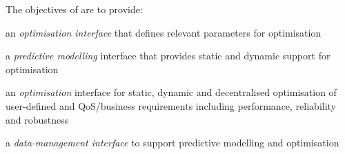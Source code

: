 \addtocounter{wpno}{1}
\begin{Workpackage}{\thewpno}
\WPTitle{\wpname{\thewpno}}


\begin{WPObjectives}
The objectives of \theWP{} are to provide:
\begin{compactitem}
\item an \emph{optimisation interface} that defines relevant parameters for optimisation
\item a \emph{predictive modelling} interface that provides static and dynamic support for optimisation
\item an \emph{optimisation} interface for static, dynamic and decentralised optimisation of user-defined and QoS/business requirements including performance, reliability and robustness
\item a \emph{data-management interface} to support predictive modelling and optimisation
\end{compactitem}

\end{WPObjectives}

%
%


\end{Workpackage}
